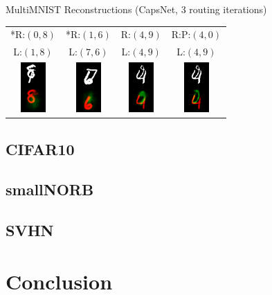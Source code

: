 \documentclass{beamer}
\begin{document}
{\begin{frame}{MultiMNIST Reconstructions (CapsNet, 3 routing iterations)}
\begin{center}
\begin{tabular}{c c c c}
          \pause
          *R:$(0,8)$ & *R:$(1,6)$ & R:$(4,9)$ &  R:P:$(4, 0)$ \\
           L:$(1,8)$ &  L:$(7,6)$ & L:$(4, 9)$ & L:$(4, 9)$ \\
          \includegraphics[height=.3\textheight]{../img/recons/1_8_8_1_264} &
          \includegraphics[height=.3\textheight]{../img/recons/7_6_6_7_4} &
          \includegraphics[height=.3\textheight]{../img/recons/4_9_4_0_453} &
          \includegraphics[height=.3\textheight]{../img/recons/4_9_4_0_454p}
        \end{tabular}
      \end{center}
    \end{frame}
  }

  \subsection{CIFAR10}

  \subsection{smallNORB}

  \subsection{SVHN}


  \section{Conclusion}
\end{document}
